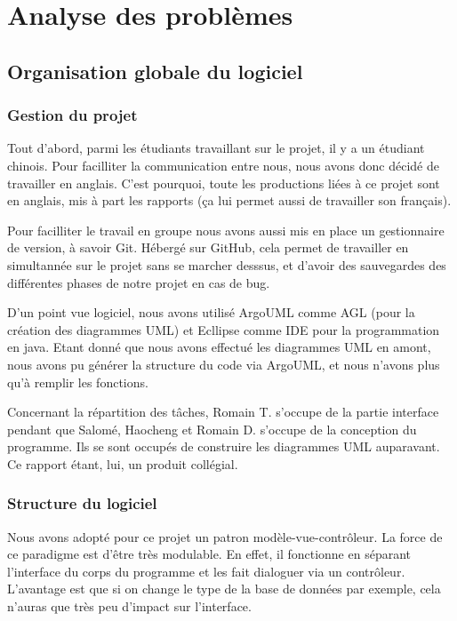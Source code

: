 \documentclass[11pt]{report}
\begin{document}
\chapter{Analyse des problèmes}

	\section{Organisation globale du logiciel}

		\subsection{Gestion du projet}
			Tout d'abord, parmi les étudiants travaillant sur le projet, il y a un étudiant chinois. Pour facilliter la communication entre nous, nous avons donc décidé de travailler en anglais. C'est pourquoi, toute les productions liées à ce projet sont en anglais, mis à part les rapports (ça lui permet aussi de travailler son français). 
			
			Pour facilliter le travail en groupe nous avons aussi mis en place un gestionnaire de version, à savoir Git. Hébergé sur GitHub\up{\copyright}, cela permet de travailler en simultannée sur le projet sans se marcher desssus, et d'avoir des sauvegardes des différentes phases de notre projet en cas de bug.
			
			D'un point vue logiciel, nous avons utilisé ArgoUML comme AGL (pour la création des diagrammes UML) et Ecllipse comme IDE pour la programmation en java. Etant donné que nous avons effectué les diagrammes UML en amont, nous avons pu générer la structure du code via ArgoUML, et nous n'avons plus qu'à remplir les fonctions.
			
			Concernant la répartition des tâches, Romain T. s'occupe de la partie interface pendant que Salomé, Haocheng et Romain D. s'occupe de la conception du programme. Ils se sont occupés de construire les diagrammes UML auparavant. Ce rapport étant, lui, un produit collégial.
			
			
		\subsection{Structure du logiciel}
		
			Nous avons adopté pour ce projet un patron modèle-vue-contrôleur. La force de ce paradigme est d'être très modulable. En effet, il fonctionne en séparant l'interface du corps du programme et les fait dialoguer via un contrôleur. L'avantage est que si on change le type de la base de données par exemple, cela n'auras que très peu d'impact sur l'interface. 
			
\end{document}

